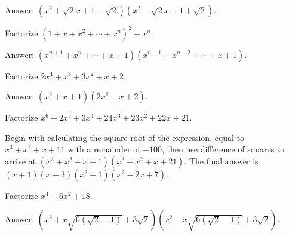 \begin{solution}[name=Solution by Parviz Shahriari]
Answer: $(x^2+\sqrt{2}x + 1 - \sqrt{2})(x^2 - \sqrt{2}x+1 + \sqrt{2})$.
\end{solution}


\begin{tcolorbox}
\begin{question}
Factorize $(1+x+x^2+\cdots+x^n)^2-x^n$.
\end{question}
\end{tcolorbox}

\begin{solution}[name=Solution by Parviz Shahriari]
Answer: $(x^{n+1}+x^n+\cdots+x+1)(x^{n-1}+x^{n-2}+\cdots+x+1)$.
\end{solution}


\begin{tcolorbox}
\begin{question}
Factorize $2x^4+x^3+3x^2+x+2$.
\end{question}
\end{tcolorbox}

\begin{solution}[name=Solution by Parviz Shahriari]
Answer: $(x^2+x+1)(2x^2-x+2)$.
\end{solution}



\begin{tcolorbox}
\begin{question}
Factorize $x^6+2x^5+3x^4+24x^3+23x^2+22x+21$.
\end{question}
\end{tcolorbox}

\begin{solution}[name=Solution by Parviz Shahriari]
Begin with calculating the square root of the expression, equal to $x^3+x^2+x+11$ with a remainder of $-100$, then use difference of squares to arrive at $(x^3+x^2+x+1)(x^3+x^2+x+21)$. The final answer is $(x+1)(x+3)(x^2+1)(x^2-2x+7)$.
\end{solution}


\begin{tcolorbox}
\begin{question}
Factorize $x^4+6x^2+18$.
\end{question}
\end{tcolorbox}

\begin{solution}[name=Solution by Parviz Shahriari]
Answer: $(x^2+x\sqrt{6(\sqrt{2}-1)}+3\sqrt{2})(x^2-x\sqrt{6(\sqrt{2}-1)}+3\sqrt{2})$.
\end{solution}




